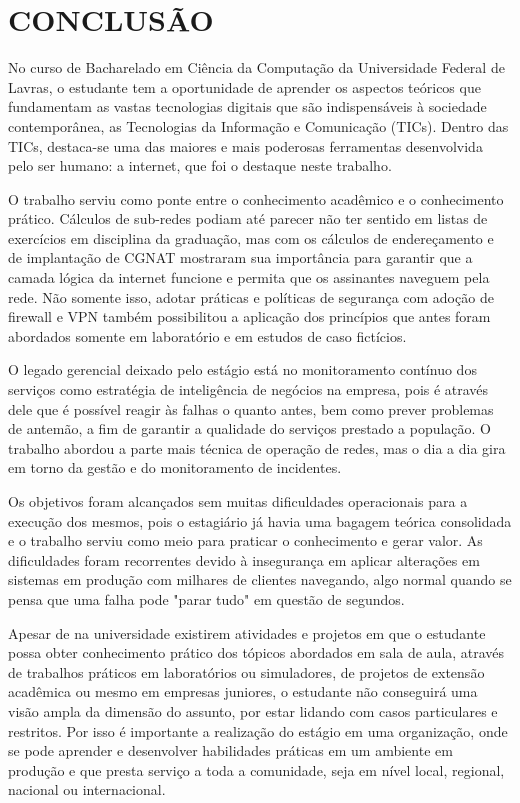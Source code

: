 \chapter{CONCLUSÃO}

    No curso de Bacharelado em Ciência da Computação da Universidade Federal de Lavras, o estudante tem a oportunidade de aprender os aspectos teóricos que fundamentam as vastas tecnologias digitais que são indispensáveis à sociedade contemporânea, as Tecnologias da Informação e Comunicação (TICs). Dentro das TICs, destaca-se uma das maiores e mais poderosas ferramentas desenvolvida pelo ser humano: a internet, que foi o destaque neste trabalho.

    O trabalho serviu como ponte entre o conhecimento acadêmico e o conhecimento prático. Cálculos de sub-redes podiam até parecer não ter sentido em listas de exercícios em disciplina da graduação, mas com os cálculos de endereçamento e de implantação de CGNAT mostraram sua importância para garantir que a camada lógica da internet funcione e permita que os assinantes naveguem pela rede. Não somente isso, adotar práticas e políticas de segurança com adoção de firewall e VPN também possibilitou a aplicação dos princípios que antes foram abordados somente em laboratório e em estudos de caso fictícios.
    
    O legado gerencial deixado pelo estágio está no monitoramento contínuo dos serviços como estratégia de inteligência de negócios na empresa, pois é através dele que é possível reagir às falhas o quanto antes, bem como prever problemas de antemão, a fim de garantir a qualidade do serviços prestado a população. O trabalho abordou a parte mais técnica de operação de redes, mas o dia a dia gira em torno da gestão e do monitoramento de incidentes.
    
    Os objetivos foram alcançados sem muitas dificuldades operacionais para a execução dos mesmos, pois o estagiário já havia uma bagagem teórica consolidada e o trabalho serviu como meio para praticar o conhecimento e gerar valor. As dificuldades foram recorrentes devido à insegurança em aplicar alterações em sistemas em produção com milhares de clientes navegando, algo normal quando se pensa que uma falha pode "parar tudo" em questão de segundos.

    Apesar de na universidade existirem atividades e projetos em que o estudante possa obter conhecimento prático dos tópicos abordados em sala de aula, através de trabalhos práticos em laboratórios ou simuladores, de projetos de extensão acadêmica ou mesmo em empresas juniores, o estudante não conseguirá uma visão ampla da dimensão do assunto, por estar lidando com casos particulares e restritos. Por isso é importante a realização do estágio em uma organização, onde se pode aprender e desenvolver habilidades práticas em um ambiente em produção e que presta serviço a toda a comunidade, seja em nível local, regional, nacional ou internacional.
    
